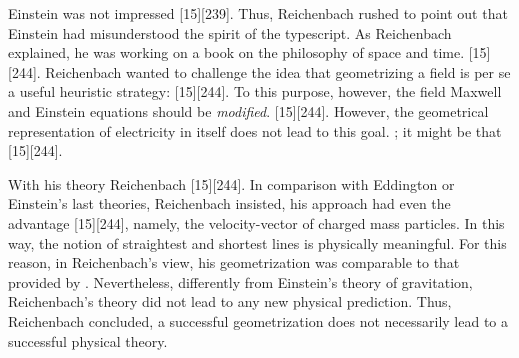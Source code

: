 \documentclass[draft]{article}
\begin{document}
Einstein was not impressed [15][239].  Thus, Reichenbach rushed to point out that Einstein had misunderstood the spirit of the typescript. As Reichenbach explained, he was working on a book on the philosophy of space and time.  [15][244].  Reichenbach wanted to challenge the idea that geometrizing a field is per se a useful heuristic strategy:  [15][244]. To this purpose, however, the field Maxwell and Einstein equations should be \emph{modified}.  [15][244]. However, the geometrical representation of electricity in itself does not lead to this goal. ; it might be that  [15][244]. 

With his theory Reichenbach  [15][244]. In comparison with Eddington or Einstein's last theories, Reichenbach insisted, his approach had even the advantage  [15][244], namely, the velocity-vector of charged mass particles. In this way, the notion of straightest and shortest lines is physically meaningful. For this reason, in Reichenbach's view, his geometrization was comparable to that provided by \gr. Nevertheless, differently from Einstein's theory of gravitation, Reichenbach's theory did not lead to any new physical prediction. Thus, Reichenbach concluded, a successful geometrization does not necessarily lead to a successful physical theory. 
\end{document}
